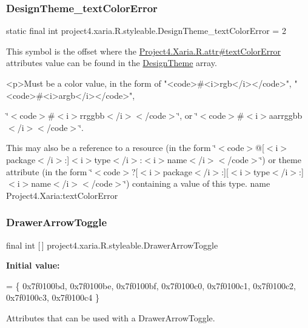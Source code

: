 \subsubsection{\texorpdfstring{Design\+Theme\+\_\+text\+Color\+Error}{DesignTheme\_textColorError}}
{\footnotesize\ttfamily static final int project4.\+xaria.\+R.\+styleable.\+Design\+Theme\+\_\+text\+Color\+Error = 2\hspace{0.3cm}{\ttfamily [static]}}

This symbol is the offset where the \hyperlink{}{Project4.\+Xaria.\+R.\+attr\#text\+Color\+Error} attribute\textquotesingle{}s value can be found in the \hyperlink{classproject4_1_1xaria_1_1R_1_1styleable_a190554b7e28f27d85d823a1301dd3cf5}{Design\+Theme} array.

\begin{DoxyVerb}      <p>Must be a color value, in the form of "<code>#<i>rgb</i></code>", "<code>#<i>argb</i></code>",
\end{DoxyVerb}
 \char`\"{}$<$code$>$\#$<$i$>$rrggbb$<$/i$>$$<$/code$>$\char`\"{}, or \char`\"{}$<$code$>$\#$<$i$>$aarrggbb$<$/i$>$$<$/code$>$\char`\"{}. 

This may also be a reference to a resource (in the form \char`\"{}$<$code$>$@\mbox{[}$<$i$>$package$<$/i$>$\+:\mbox{]}$<$i$>$type$<$/i$>$\+:$<$i$>$name$<$/i$>$$<$/code$>$\char`\"{}) or theme attribute (in the form \char`\"{}$<$code$>$?\mbox{[}$<$i$>$package$<$/i$>$\+:\mbox{]}\mbox{[}$<$i$>$type$<$/i$>$\+:\mbox{]}$<$i$>$name$<$/i$>$$<$/code$>$\char`\"{}) containing a value of this type.  name Project4.\+Xaria\+:text\+Color\+Error \mbox{\label{classproject4_1_1xaria_1_1R_1_1styleable_aa8594da8de0b2617c3d5cd5e028f8b77}} 
\subsubsection{\texorpdfstring{Drawer\+Arrow\+Toggle}{DrawerArrowToggle}}
{\footnotesize\ttfamily final int \mbox{[}$\,$\mbox{]} project4.\+xaria.\+R.\+styleable.\+Drawer\+Arrow\+Toggle\hspace{0.3cm}{\ttfamily [static]}}

{\bfseries Initial value\+:}
\begin{DoxyCode}
= \{
            0x7f0100bd, 0x7f0100be, 0x7f0100bf, 0x7f0100c0,
            0x7f0100c1, 0x7f0100c2, 0x7f0100c3, 0x7f0100c4
        \}
\end{DoxyCode}
Attributes that can be used with a Drawer\+Arrow\+Toggle. 

